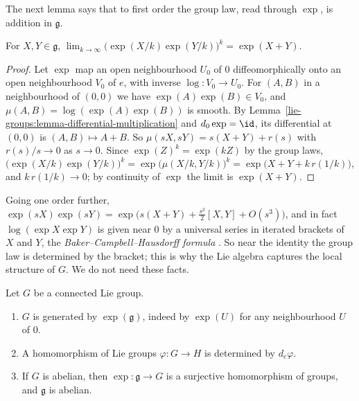 The next lemma says that to first order the group law, read through $\exp$, is addition in $\mathfrak{g}$.

\begin{lemma}\label{lie-groups:lemma-product-formula}
For $X, Y \in \mathfrak{g}$, $\lim_{k \to \infty}\bigl(\exp(X/k)\exp(Y/k)\bigr)^k = \exp(X + Y)$.
\end{lemma}

\begin{proof}
Let $\exp$ map an open neighbourhood $U_0$ of $0$ diffeomorphically onto an open neighbourhood $V_0$ of $e$, with inverse $\log \colon V_0 \to U_0$. For
$(A, B)$ in a neighbourhood of $(0, 0)$ we have $\exp(A)\exp(B) \in V_0$, and $\mu(A, B) = \log(\exp(A)\exp(B))$ is smooth. By
Lemma~\ref{lie-groups:lemma-differential-multiplication} and $d_0\exp = \id$, its differential at $(0, 0)$ is $(A, B) \mapsto A + B$. So
$\mu(sX, sY) = s(X + Y) + r(s)$ with $r(s)/s \to 0$ as $s \to 0$. Since $\exp(Z)^k = \exp(kZ)$ by the group laws,
\[
\bigl(\exp(X/k)\exp(Y/k)\bigr)^k = \exp\bigl(\mu(X/k, Y/k)\bigr)^k = \exp\bigl(X + Y + k\,r(1/k)\bigr),
\]
and $k\,r(1/k) \to 0$; by continuity of $\exp$ the limit is $\exp(X + Y)$.
\end{proof}

\begin{remark}\label{lie-groups:remark-bch}
Going one order further, $\exp(sX)\exp(sY) = \exp\bigl(s(X + Y) + \tfrac{s^2}{2}[X, Y] + O(s^3)\bigr)$, and in fact
$\log(\exp X\exp Y)$ is given near $0$ by a universal series in iterated brackets of $X$ and $Y$, the \emph{Baker--Campbell--Hausdorff formula}
\cite[Chapter 1]{knapp-lie}. So near the identity the group law is determined by the bracket; this is why the Lie algebra captures the local structure of $G$.
We do not need these facts.
\end{remark}

\begin{proposition}\label{lie-groups:proposition-connected-generated}
Let $G$ be a connected Lie group.
\begin{enumerate}
\item $G$ is generated by $\exp(\mathfrak{g})$, indeed by $\exp(U)$ for any neighbourhood $U$ of $0$.
\item A homomorphism of Lie groups $\varphi \colon G \to H$ is determined by $d_e\varphi$.
\item If $G$ is abelian, then $\exp \colon \mathfrak{g} \to G$ is a surjective homomorphism of groups, and $\mathfrak{g}$ is abelian.
\end{enumerate}
\end{proposition}

